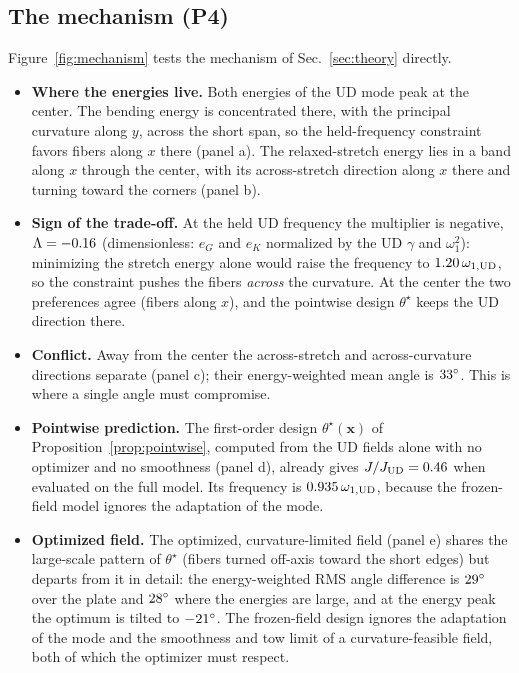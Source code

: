 \subsection{The mechanism (P4)}\label{sec:mechanism}
Figure~\ref{fig:mechanism} tests the mechanism of Sec.~\ref{sec:theory} directly.
\begin{itemize}[itemsep=1pt]
\item \textbf{Where the energies live.} Both energies of the UD mode peak at the center.
  The bending energy is concentrated there, with the principal curvature along $y$, across
  the short span, so the held-frequency constraint favors fibers along $x$ there (panel a). The relaxed-stretch energy lies in a band along $x$ through
  the center, with its across-stretch direction along $x$ there and turning toward the
  corners (panel b).
\item \textbf{Sign of the trade-off.} At the held UD frequency the multiplier is negative,
  $\Lambda=-0.16$ (dimensionless: $e_G$ and $e_K$ normalized by the UD $\gamma$ and
  $\omega_1^2$): minimizing the stretch energy alone would raise the frequency to
  $1.20\,\omega_{1,\mathrm{UD}}$, so the constraint pushes the fibers \emph{across} the
  curvature. At the center the two preferences agree (fibers along $x$), and the pointwise design
  $\theta^\star$ keeps the UD direction there.
\item \textbf{Conflict.} Away from the center the across-stretch and across-curvature
  directions separate (panel c); their energy-weighted mean angle is $33^\circ$.
  This is where a single angle must compromise.
\item \textbf{Pointwise prediction.} The first-order design $\theta^\star(\bm x)$ of
  Proposition~\ref{prop:pointwise}, computed from the UD fields alone with no optimizer
  and no smoothness (panel d), already gives $J/J_{\mathrm{UD}}=0.46$ when evaluated on the
  full model. Its frequency is $0.935\,\omega_{1,\mathrm{UD}}$, because the frozen-field model
  ignores the adaptation of the mode.
\item \textbf{Optimized field.} The optimized, curvature-limited field (panel e) shares the
  large-scale pattern of $\theta^\star$ (fibers turned off-axis toward the short edges) but
  departs from it in detail: the energy-weighted RMS angle difference is $29^\circ$
  over the plate and $28^\circ$ where the energies are large, and at the energy
  peak the optimum is tilted to $-21^\circ$. The frozen-field design ignores the
  adaptation of the mode and the smoothness and tow limit of a curvature-feasible field, both
  of which the optimizer must respect.
\end{itemize}

